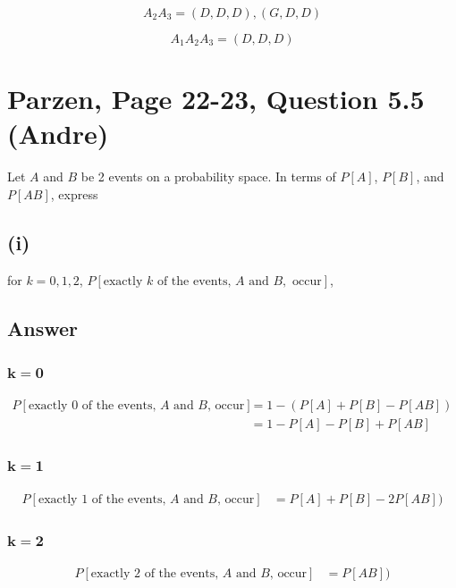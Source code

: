 \documentclass[11pt]{article}
\begin{document}
\[
A_2A_3 = {(D, D, D), (G, D, D)}
\]


\[
A_1A_2A_3 = {(D, D, D)}
\]


\section*{Parzen, Page 22-23, Question 5.5 (Andre)}

Let \(A\) and \(B\) be 2 events on a probability space. In terms of \(P[A]\), \(P[B]\), and \(P[AB]\), express

\subsection*{(i)}

for \(k = 0, 1, 2\), \(P[\text{exactly } k \text{ of the events, } A \text{ and } B, \text{ occur}]\),

\subsection*{Answer}

\subsubsection*{$\mathbf{k=0}$}


\begin{align*}
    P[\text{exactly } 0 \text{ of the events, } A \text{ and } B \text{, occur}] &= 1 - (P[A] + P[B] - P[AB])\\
    &= 1-P[A]-P[B]+P[AB]
\end{align*}

\subsubsection*{$\mathbf{k=1}$}

\begin{align*}
    P[\text{exactly } 1 \text{ of the events, } A \text{ and } B \text{, occur}] &= P[A] + P[B] - 2P[AB])
\end{align*}

\subsubsection*{$\mathbf{k=2}$}

\begin{align*}
    P[\text{exactly } 2 \text{ of the events, } A \text{ and } B \text{, occur}] &= P[AB])
\end{align*}
\end{document}
